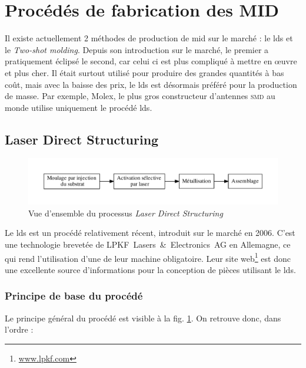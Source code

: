\section{Procédés de fabrication des MID}
Il existe actuellement 2 méthodes de production de \gls{mid} sur le marché : le \gls{lds} et le \emph{Two-shot molding}.
Depuis son introduction sur le marché, le premier a pratiquement éclipsé le second, car celui ci est plus compliqué à mettre en œuvre et plus cher.
Il était surtout utilisé pour produire des grandes quantités à bas coût, mais avec la baisse des prix, le \gls{lds} est désormais préféré pour la production de masse.
Par exemple, Molex, le plus gros constructeur d'antennes \textsc{smd} au monde utilise uniquement le procédé \gls{lds}.

\subsection{Laser Direct Structuring}
\begin{figure}[h]
    \begin{center}
        \includegraphics[width=\textwidth]{../images/lds_process}
        \caption{Vue d'ensemble du processus \emph{Laser Direct Structuring}}\label{fig:lds-process}
    \end{center}
\end{figure}
Le \gls{lds} est un procédé relativement récent, introduit sur le marché en 2006.
C'est une technologie brevetée de LPKF~Lasers~\&~Electronics~AG en Allemagne, ce qui rend l'utilisation d'une de leur machine obligatoire.
Leur site web\footnote{\url{www.lpkf.com}} est donc une excellente source d'informations pour la conception de pièces utilisant le \gls{lds}.

\subsubsection{Principe de base du procédé}
Le principe général du procédé est visible à la fig.
\ref{fig:lds-process}.
On retrouve donc, dans l'ordre :

